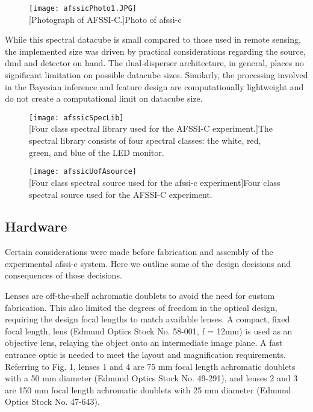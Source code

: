 \begin{figure}[htb]
	\centering
	\texttt{[image: afssicPhoto1.JPG]}\\
	[Photograph of AFSSI-C.]{Photo of \gls{afssi-c}}
	\label{fig:afssicPhoto1}
\end{figure}


While this spectral datacube is small compared to those used in remote sensing, the implemented size was driven by practical considerations regarding the source, \gls{dmd} and detector on hand. The dual-disperser architecture, in general, places no significant limitation on possible datacube sizes. Similarly, the processing involved in the Bayesian inference and feature design are computationally lightweight and do not create a computational limit on datacube size.

\begin{figure}[htb]
	\centering
	\texttt{[image: afssicSpecLib]}\\
	[Four class spectral library used for the AFSSI-C experiment.]{The spectral library consists of four spectral classes: the white, red, green, and blue of the LED monitor.}
	\label{fig:afssicSpecLib}
\end{figure}


\begin{figure}[htb]
	\centering
	\texttt{[image: afssicUofAsource]}\\
	[Four class spectral source used for the \gls{afssi-c} experiment]{Four class spectral source used for the AFSSI-C experiment.}
	\label{fig:afssicUofAsource}
\end{figure}

\subsection{Hardware}

Certain considerations were made before fabrication and assembly of the experimental \gls{afssi-c} system. Here we outline some of the design decisions and consequences of those decisions.

Lenses are off-the-shelf achromatic doublets to avoid the need for custom fabrication. This also limited the degrees of freedom in the optical design, requiring the design focal lengths to match available lenses. A compact, fixed focal length, lens (Edmund Optics Stock No. 58-001, f = 12mm) is used as an objective lens, relaying the object onto an intermediate image plane. A fast entrance optic is needed to meet the layout and magnification requirements. Referring to Fig. 1, lenses 1 and 4 are 75 mm focal length achromatic doublets with a 50 mm diameter (Edmund Optics Stock No. 49-291), and lenses 2 and 3 are 150 mm focal length achromatic doublets with 25 mm diameter (Edmund Optics Stock No. 47-643). 

